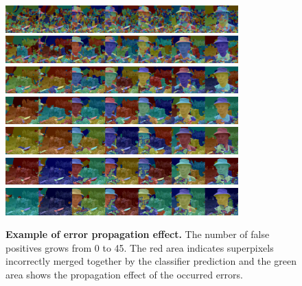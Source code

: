 \begin{figure}[htbp]
\centering
\includegraphics[width=0.8\textwidth]{images/errors/Marplefour_4_0.png}
\includegraphics[width=0.8\textwidth]{images/errors/Marplefour_6_3.png}
\includegraphics[width=0.8\textwidth]{images/errors/Marplefour_7_14.png}
\includegraphics[width=0.8\textwidth]{images/errors/Marplefour_10_20.png}
\includegraphics[width=0.8\textwidth]{images/errors/Marplefour_12_29.png}
\includegraphics[width=0.8\textwidth]{images/errors/Marplefour_13_35.png}
\includegraphics[width=0.8\textwidth]{images/errors/Marplefour_15_45.png}
\caption[Example of error propagation effect]{
{\bf Example of error propagation effect.} The number of false positives grows from 0 to 45.
The red area indicates superpixels incorrectly merged together by the classifier prediction and the green area shows the propagation effect of the occurred errors.}
\label{fig:err_eff}
\end{figure}

